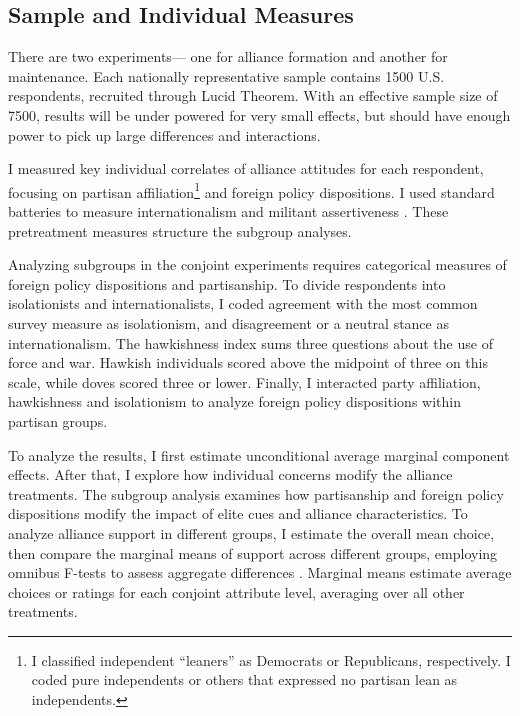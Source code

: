 \documentclass[12pt]{article}
\begin{document}
\subsection{Sample and Individual Measures}


There are two experiments--- one for alliance formation and another for maintenance. 
Each nationally representative sample contains 1500 U.S. respondents, recruited through Lucid Theorem.
With an effective sample size of 7500, results will be under powered for very small effects, but should have enough power to pick up large differences and interactions. 


I measured key individual correlates of alliance attitudes for each respondent, focusing on partisan affiliation\footnote{I classified independent ``leaners'' as Democrats or Republicans, respectively. I coded pure independents or others that expressed no partisan lean as independents.} and foreign policy dispositions. 
I used standard batteries to measure internationalism and militant assertiveness \citep{Herrmannetal1999, KertzerBrutger2016}.
These pretreatment measures structure the subgroup analyses. 


Analyzing subgroups in the conjoint experiments requires categorical measures of foreign policy dispositions and partisanship. 
To divide respondents into isolationists and internationalists, I coded agreement with the most common survey measure as isolationism, and disagreement or a neutral stance as internationalism. 
The hawkishness index sums three questions about the use of force and war. 
Hawkish individuals scored above the midpoint of three on this scale, while doves scored three or lower. 
Finally, I interacted party affiliation, hawkishness and isolationism to analyze foreign policy dispositions within partisan groups.



To analyze the results, I first estimate unconditional average marginal component effects.
After that, I explore how individual concerns modify the alliance treatments.
The subgroup analysis examines how partisanship and foreign policy dispositions modify the impact of elite cues and alliance characteristics. 
To analyze alliance support in different groups, I estimate the overall mean choice, then compare the marginal means of support across different groups, employing omnibus F-tests to assess aggregate differences \citep{Leeperetal2020}. 
Marginal means estimate average choices or ratings for each conjoint attribute level, averaging over all other treatments. 
\end{document}
